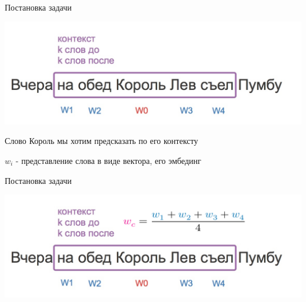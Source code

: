 \documentclass[notes,12pt, aspectratio=169]{beamer}
\newenvironment{wideitemize}{\itemize\addtolength{\itemsep}{10pt}}{\enditemize}
\begin{document}
\begin{frame}{Постановка задачи}
\begin{center}
\includegraphics[width=.7\linewidth]{context.jpg}
\end{center}

\begin{wideitemize} 
	\item Слово \alert{Король} мы хотим предсказать по его контексту
	\item $w_i$ - представление слова в виде вектора, его эмбединг
\end{wideitemize} 
\end{frame}
	
	
\begin{frame}{Постановка задачи}
\begin{center}
	\includegraphics[width=.7\linewidth]{context_1.jpg}
\end{center}
\begin{wideitemize} 
\end{wideitemize} 	
\end{frame}
\end{document}
